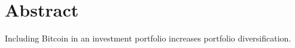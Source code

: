 \chapter{Abstract}
\label{chpr:abstract}
Including Bitcoin in an investment portfolio increases portfolio  diversification.
